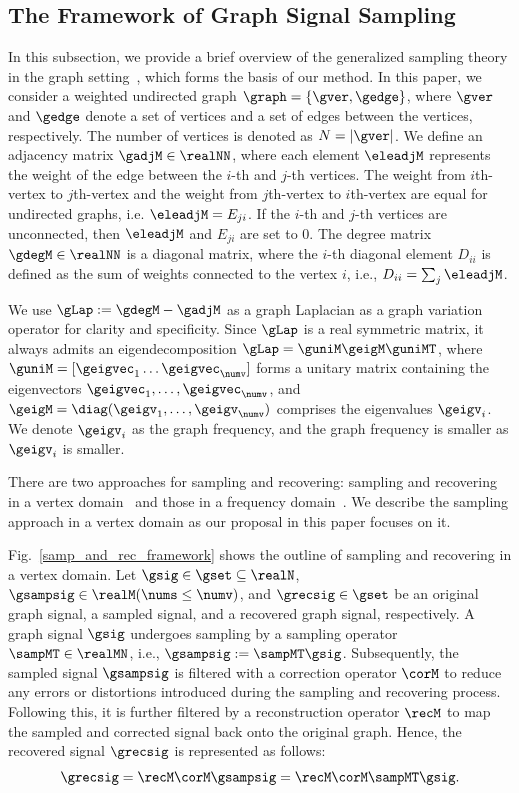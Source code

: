 \documentclass[journal]{IEEEtran}
\begin{document}
\subsection{The Framework of Graph Signal Sampling}
\label{subsec:gs_sampling}
In this subsection, we provide a brief overview of the generalized sampling theory in the graph setting~\cite{tanaka2020gensamp,tanaka2020sampling}, which forms the basis of our method.
In this paper, we consider a weighted undirected graph $\graph = \{\gver, \gedge\}$, where $\gver$ and $\gedge$ denote a set of vertices and a set of edges between the vertices, respectively. 
The number of vertices is denoted as $N = |\gver|$.
We define an adjacency matrix $\gadjM \in \realNN$, where each element $\eleadjM$ represents the weight of the edge between the $i$-th and $j$-th vertices. 
The weight from $i$th-vertex to $j$th-vertex and the weight from $j$th-vertex to $i$th-vertex are equal for undirected graphs, i.e. $\eleadjM = E_{ji}$.
If the $i$-th and $j$-th vertices are unconnected, then $\eleadjM$ and $E_{ji}$ are set to $0$.
The degree matrix $\gdegM \in \realNN$ is a diagonal matrix, where the $i$-th diagonal element $D_{ii}$ is defined as the sum of weights connected to the vertex $i$, i.e., $D_{ii} = \sum_{j}\eleadjM$.

We use $\gLap := \gdegM - \gadjM$ as a graph Laplacian as a graph variation operator for clarity and specificity.
Since $\gLap$ is a real symmetric matrix, it always admits an eigendecomposition $\gLap = \guniM \geigM \guniMT$, where $\guniM = [\geigvec_1 \dots \geigvec_\numv]$ forms a unitary matrix containing the eigenvectors $\geigvec_{1}, \dots, \geigvec_{\numv}$, and $\geigM = \diag(\geigv_1,\dots,\geigv_\numv)$ comprises the eigenvalues $\geigv_i$.
We denote $\geigv_i$ as the graph frequency, and the graph frequency is smaller as $\geigv_i$ is smaller.

There are two approaches for sampling and recovering: sampling and recovering in a vertex domain~\cite{anis2016efficient,chen2015discrete} and those in a frequency domain~\cite{tanaka2018spectral}.
We describe the sampling approach in a vertex domain as our proposal in this paper focuses on it.

Fig.~\ref{samp_and_rec_framework} shows the outline of sampling and recovering in a vertex domain.
Let $\gsig \in \gset \subseteq \realN$, $\gsampsig \in \realM (\nums \leq \numv)$, and $\grecsig \in \gset$ be an original graph signal, a sampled signal, and a recovered graph signal, respectively.
A graph signal $\gsig$ undergoes sampling by a sampling operator $\sampMT \in \realMN$, i.e., $\gsampsig := \sampMT \gsig$.
Subsequently, the sampled signal $\gsampsig$ is filtered with a correction operator $\corM$ to reduce any errors or distortions introduced during the sampling and recovering process.
Following this, it is further filtered by a reconstruction operator $\recM$ to map the sampled and corrected signal back onto the original graph.
Hence, the recovered signal $\grecsig$ is represented as follows:
\begin{equation}
\label{gsig_recovery}
\grecsig = \recM \corM \gsampsig = \recM \corM \sampMT \gsig.
\end{equation}
\end{document}
